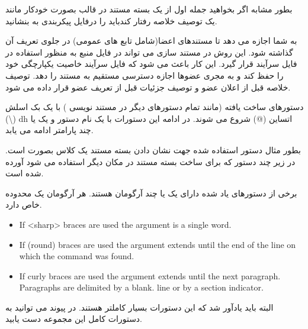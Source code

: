 بطور مشابه اگر بخواهید جمله اول از یک بسته مستند در قالب  بصورت خودکار
مانند یک توصیف خلاصه رفتار کندباید  را درفایل پیکربندی
به بنشانید.

 به شما اجازه می دهد تا مستندهای اعضا(شامل تابع های عمومی) در جلوی
تعریف آن  گذاشته شود. این روش در مستند سازی می تواند در فایل منبع
به منظور استفاده در فایل سرآیند قرار گیرد. این کار باعث می شود که فایل سرآیند
خاصیت یکپارچگی خود را حفظ کند و به مجری عضوها اجازه دسترسی مستقیم به مستند را
دهد. توصیف خلاصه قبل از اعلان عضو و توصیف جزئیات قبل از تعریف عضو قرار داده می
شود.



دستورهای ساخت یافته (مانند تمام دستورهای دیگر در مستند نویسی ) با یک
بک اسلش (\textbackslash) dh اتساین (@) شروع می شوند.
در ادامه این دستورات با یک نام دستور و یک یا چند پارامتر ادامه می یابد.

بطور مثال دستور استفاده شده جهت نشان دادن بسته مستند یک کلاس بصورت
است. در زیر چند دستور که برای ساخت بسته مستند در مکان دیگر استفاده می شود آورده
شده است.


برخی از دستورهای یاد شده دارای یک یا چند آرگومان هستند. هر آرگومان یک محدوده خاص دارد.

\begin{itemize}
  \item     If <sharp> braces are used the argument is a single word.
  \item     If (round) braces are used the argument extends until the end of the line on which the command was found.
  \item     If {curly} braces are used the argument extends until the next paragraph. Paragraphs are delimited by a blank. line or by a section indicator.
\end{itemize}

البته باید یادآور شد که این دستورات بسیار کاملتر هستند.
در پیوند \cite{doxycommand} می توانید به دستورات کامل این مجموعه دست یابید.

